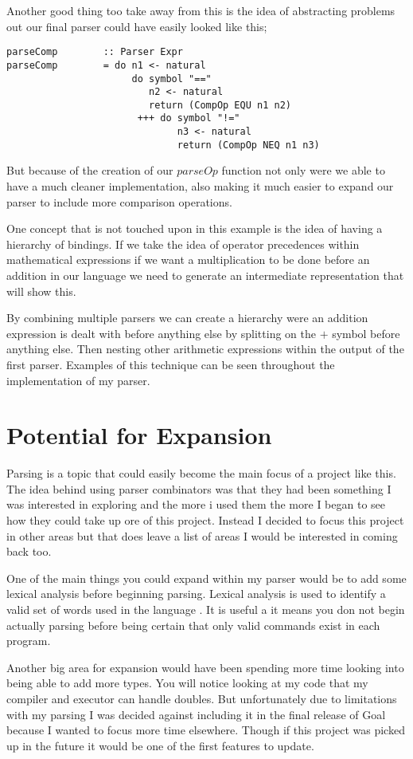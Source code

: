 Another good thing too take away from this is the idea of abstracting problems out our final parser could have easily looked like this;

\begin{lstlisting}
parseComp        :: Parser Expr	
parseComp        = do n1 <- natural
                      do symbol "==" 
                         n2 <- natural
                         return (CompOp EQU n1 n2)
                       +++ do symbol "!="
                              n3 <- natural
                              return (CompOp NEQ n1 n3)
\end{lstlisting}

But because of the creation of our $parseOp$ function not only were we able to have a much cleaner implementation, also making it  much easier to expand our parser to include more comparison operations.

One concept that is not touched upon in this example is the idea of having a hierarchy of bindings. If we take the idea of operator precedences within mathematical expressions if we want a multiplication to be done before an addition in our language we need to generate an intermediate representation that will show this.

By combining multiple parsers we can create a hierarchy were an addition expression is dealt with before anything else by splitting on the $+$ symbol before anything else. Then nesting other arithmetic expressions within the output of the first parser. Examples of this technique can be seen throughout the implementation of my parser.


\section{Potential for Expansion}

Parsing is a topic that could easily become the main focus of a project like this. The idea behind using parser combinators was that they had been something I was interested in exploring and the more i used them the more I began to see how they could take up ore of this project. Instead I decided to focus this project in other areas but that does leave a list of areas I would be interested in coming back too. 

One of the main things you could expand within my parser would be to add some lexical analysis before beginning parsing. Lexical analysis is used to identify a valid set of words used in the language \cite[p.~13]{CompDes2005}. It is useful a it means you don not begin actually parsing before being certain that only valid commands exist in each program.

Another big area for expansion would have been spending more time looking into being able to add more types. You will notice looking at my code that my compiler and executor can handle doubles. But unfortunately due to limitations with my parsing I was decided against including it in the final release of Goal because I wanted to focus more time elsewhere. Though if this project was picked up in the future it would be one of the first features to update.    

   
 
